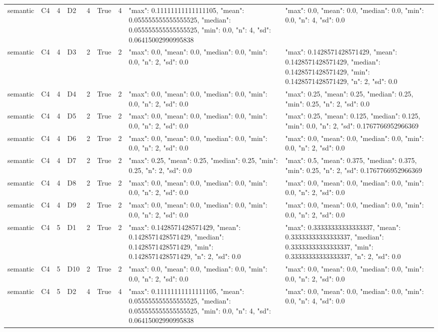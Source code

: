 \begin{tabular}{lllllllll}
semantic & C4 & 4 & D2 & 4 & True & 4 & {"max": 0.11111111111111105, "mean": 0.055555555555555525, "median": 0.055555555555555525, "min": 0.0, "n": 4, "sd": 0.06415002990995838} & {"max": 0.0, "mean": 0.0, "median": 0.0, "min": 0.0, "n": 4, "sd": 0.0} \\
semantic & C4 & 4 & D3 & 2 & True & 2 & {"max": 0.0, "mean": 0.0, "median": 0.0, "min": 0.0, "n": 2, "sd": 0.0} & {"max": 0.1428571428571429, "mean": 0.1428571428571429, "median": 0.1428571428571429, "min": 0.1428571428571429, "n": 2, "sd": 0.0} \\
semantic & C4 & 4 & D4 & 2 & True & 2 & {"max": 0.0, "mean": 0.0, "median": 0.0, "min": 0.0, "n": 2, "sd": 0.0} & {"max": 0.25, "mean": 0.25, "median": 0.25, "min": 0.25, "n": 2, "sd": 0.0} \\
semantic & C4 & 4 & D5 & 2 & True & 2 & {"max": 0.0, "mean": 0.0, "median": 0.0, "min": 0.0, "n": 2, "sd": 0.0} & {"max": 0.25, "mean": 0.125, "median": 0.125, "min": 0.0, "n": 2, "sd": 0.1767766952966369} \\
semantic & C4 & 4 & D6 & 2 & True & 2 & {"max": 0.0, "mean": 0.0, "median": 0.0, "min": 0.0, "n": 2, "sd": 0.0} & {"max": 0.0, "mean": 0.0, "median": 0.0, "min": 0.0, "n": 2, "sd": 0.0} \\
semantic & C4 & 4 & D7 & 2 & True & 2 & {"max": 0.25, "mean": 0.25, "median": 0.25, "min": 0.25, "n": 2, "sd": 0.0} & {"max": 0.5, "mean": 0.375, "median": 0.375, "min": 0.25, "n": 2, "sd": 0.1767766952966369} \\
semantic & C4 & 4 & D8 & 2 & True & 2 & {"max": 0.0, "mean": 0.0, "median": 0.0, "min": 0.0, "n": 2, "sd": 0.0} & {"max": 0.0, "mean": 0.0, "median": 0.0, "min": 0.0, "n": 2, "sd": 0.0} \\
semantic & C4 & 4 & D9 & 2 & True & 2 & {"max": 0.0, "mean": 0.0, "median": 0.0, "min": 0.0, "n": 2, "sd": 0.0} & {"max": 0.0, "mean": 0.0, "median": 0.0, "min": 0.0, "n": 2, "sd": 0.0} \\
semantic & C4 & 5 & D1 & 2 & True & 2 & {"max": 0.1428571428571429, "mean": 0.1428571428571429, "median": 0.1428571428571429, "min": 0.1428571428571429, "n": 2, "sd": 0.0} & {"max": 0.33333333333333337, "mean": 0.33333333333333337, "median": 0.33333333333333337, "min": 0.33333333333333337, "n": 2, "sd": 0.0} \\
semantic & C4 & 5 & D10 & 2 & True & 2 & {"max": 0.0, "mean": 0.0, "median": 0.0, "min": 0.0, "n": 2, "sd": 0.0} & {"max": 0.0, "mean": 0.0, "median": 0.0, "min": 0.0, "n": 2, "sd": 0.0} \\
semantic & C4 & 5 & D2 & 4 & True & 4 & {"max": 0.11111111111111105, "mean": 0.055555555555555525, "median": 0.055555555555555525, "min": 0.0, "n": 4, "sd": 0.06415002990995838} & {"max": 0.0, "mean": 0.0, "median": 0.0, "min": 0.0, "n": 4, "sd": 0.0} \\

\end{tabular}
